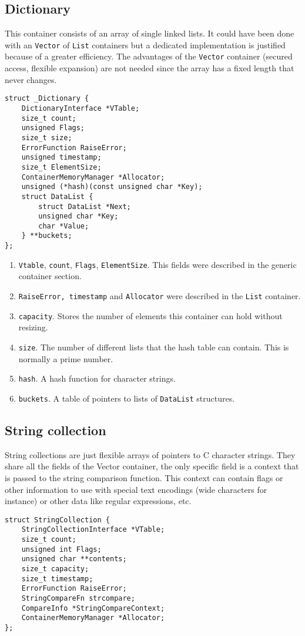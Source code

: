 \documentclass[12pt,a4paper]{memoir} %
\begin{document}
{{\subsection{Dictionary}
This container consists of an array of single linked lists. It could have been done with an \texttt{Vector} of \texttt{List} containers but a dedicated implementation is justified because of a greater efficiency. The advantages of the \texttt{Vector} container (secured access, flexible expansion) are not needed since the array has a fixed length that never changes.
\begin{verbatim}
struct _Dictionary {
    DictionaryInterface *VTable;
    size_t count;
    unsigned Flags;
    size_t size;
    ErrorFunction RaiseError;
    unsigned timestamp;
    size_t ElementSize;
    ContainerMemoryManager *Allocator;
    unsigned (*hash)(const unsigned char *Key);
    struct DataList {
        struct DataList *Next;
        unsigned char *Key;
        char *Value;
    } **buckets;
};
\end{verbatim}
\begin{enumerate}
\item \texttt{Vtable}, \texttt{count}, \texttt{Flags}, \texttt{ElementSize}. This fields were described in the generic container section.
\item \texttt{RaiseError, timestamp} and \texttt{Allocator} were described in the \texttt{List} container.
\item \texttt{capacity}. Stores the number of elements this container can hold without resizing.
\item \texttt{size}. The number of different lists that the hash table can contain. This is normally a prime number.
\item \texttt{hash}. A hash function for character strings.
\item \texttt{buckets}. A table of pointers to lists of \texttt{DataList} structures.
\end{enumerate}
\subsection{String collection}
String collections are just flexible arrays of pointers to C character strings. They share all the fields of the Vector container, the only specific field is a context that is passed to the string comparison function. This context can contain flags or other information to use with special text encodings (wide characters for instance) or other data like regular expressions, etc.
\begin{verbatim}
struct StringCollection {
    StringCollectionInterface *VTable;
    size_t count; 
    unsigned int Flags;
    unsigned char **contents;
    size_t capacity;
    size_t timestamp;
    ErrorFunction RaiseError;
    StringCompareFn strcompare;
    CompareInfo *StringCompareContext;
    ContainerMemoryManager *Allocator;
};
\end{verbatim}
}}
\end{document}
